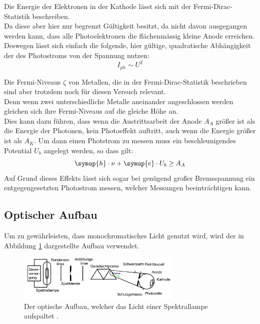     \noindent Die Energie der Elektronen in der Kathode lässt sich mit der Fermi-Dirac-Statistik beschreiben.\\
    Da diese aber hier nur begrenzt Gültigkeit besitzt, da nicht davon ausgegangen werden kann, dass alle Photoelektronen die flächenmässig kleine Anode erreichen.
    Deswegen lässt sich einfach die folgende, hier gültige, quadratische Abhängigkeit der des Photostroms von der Spannung nutzen:
    \begin{equation}
        I_{ph} \sim U^2
        \label{eqn:quad}
    \end{equation}

    Die Fermi-Niveaus $\zeta$ von Metallen, die in der Fermi-Dirac-Statistik beschrieben sind aber trotzdem noch für diesen Versuch relevant.\\
    Denn wenn zwei unterschiedliche Metalle aneinander angeschlossen werden gleichen sich ihre Fermi-Niveaus auf die gleiche Höhe an.\\
    Dies kann dazu führen, dass wenn die Austrittsarbeit der Anode $A_A$ größer ist als die Energie der Photonen, kein Photoeffekt auftritt, auch wenn die Energie größer ist als $A_K$.
    Um dann einen Photstrom zu messen muss ein beschleunigendes Potential $U_b$ angelegt werden, so dass gilt:
    \begin{equation*}
        \symup{h} \cdot \nu + \symup{e} \cdot U_b \geq A_A
    \end{equation*}
    Auf Grund dieses Effekts lässt sich sogar bei genügend großer Bremsspannung ein entgegengesetzten Photostrom messen, welcher Messungen beeinträchtigen kann.




    \subsection{Optischer Aufbau}

    Um zu gewährleisten, dass monochromatisches Licht genutzt wird, wird der in Abbildung \ref{img:linse} dargestellte Aufbau verwendet.


    \begin{figure}[H]
        \centering
        \includegraphics[width=0.7\textwidth]{latex/images/Optiken.PNG}
        \caption{Der optische Aufbau, welcher das Licht einer Spektrallampe aufspaltet  \protect \cite{500}.}
        \label{img:linse}
    \end{figure}

